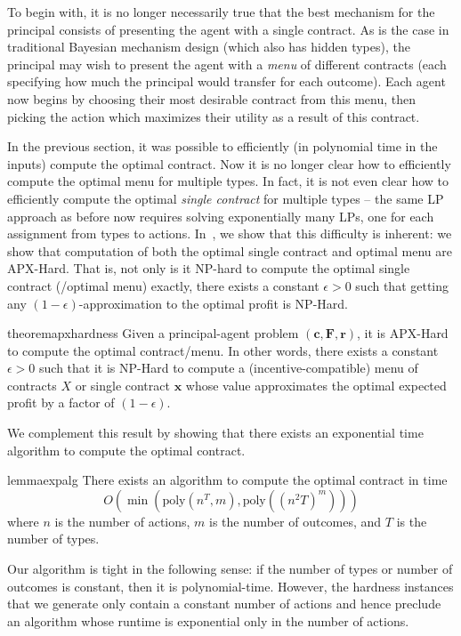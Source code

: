 \documentclass{article}
\newcommand{\poly}{\mathrm{poly}}
\newcommand{\costvector}{\bm{c}}
\newcommand{\ForecastTensor}{\bm{F}}
\newcommand{\rewardvector}{\bm{r}}
\newcommand{\PrincipalAgentProblem}{\left(\costvector, \ForecastTensor, \rewardvector\right)}
\newcommand{\ContractVector}{\bm{x}}
\newcommand{\ContractMatrix}{X}
\newcommand{\ApxHard}{\textsc{APX}-Hard\xspace}
\newcommand{\NPHard}{\textsc{NP}-Hard\xspace}
\begin{document}
To begin with, it is no longer necessarily true that the best mechanism for the principal consists of presenting the agent with a single contract. As is the case in traditional Bayesian mechanism design (which also has hidden types), the principal may wish to present the agent with a \emph{menu} of different contracts (each specifying how much the principal would transfer for each outcome). Each agent now begins by  choosing their most desirable contract from this menu, then picking the action which maximizes their utility as a result of this contract. 

In the previous section, it was possible to efficiently (in polynomial time in the inputs) compute the optimal contract. Now it is no longer clear how to efficiently compute the optimal menu for multiple types. In fact, it is not even clear how to efficiently compute the optimal \textit{single contract} for multiple types -- the same LP approach as before now requires solving exponentially many LPs, one for each assignment from types to actions. In~, we show that this difficulty is inherent: we show that computation of both the optimal single contract and optimal menu are \ApxHard{}. That is, not only is it NP-hard to compute the optimal single contract (/optimal menu) exactly, there exists a constant $\epsilon > 0$ such that getting any $(1 - \epsilon)$-approximation to the optimal profit is \NPHard{}.

\begin{restatable}{theorem}{apxhardness}
\label{thm:apx-hard}
  Given a principal-agent problem $\PrincipalAgentProblem$, it is \ApxHard to compute the optimal contract/menu. In other words, there exists a constant $\epsilon > 0$ such that it is \NPHard to compute a (incentive-compatible) menu of contracts $\ContractMatrix$ or single contract $\ContractVector$ whose value approximates the optimal expected profit by a factor of $(1 - \epsilon)$. 
\end{restatable}

We complement this result by showing that there exists an exponential time algorithm to compute the optimal contract. 
\begin{restatable}{lemma}{expalg}
\label{lem:algorithm}
There exists an algorithm to compute the optimal contract in time 
$$O(\min(\poly(n^T,m), \poly((n^2T)^m)))$$ 
\noindent
where $n$ is the number of actions, $m$ is the number of outcomes, and $T$ is the number of types. 
\end{restatable}
Our algorithm is tight in the following sense: if the number of types or number of outcomes is constant, then it is polynomial-time. However, the hardness instances that we generate only contain a constant number of actions and hence preclude an algorithm whose runtime is exponential only in the number of actions. 
\end{document}
